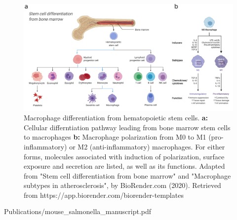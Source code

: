 \begin{figure}[htb]
    \includegraphics[width=\textwidth]{Parts/Part02/gfx/macrophage_differentiation.png}
    \caption[Macrophage differentiation.]{Macrophage differentiation from hematopoietic stem cells. \textbf{a:} Cellular differntiation pathway leading from bone marrow stem cells to macrophages \textbf{b:} Macrophage polarization from M0 to M1 (pro-inflammatory) or M2 (anti-inflammatory) macrophages. For either forms, molecules associated with induction of polarization, surface exposure and secretion are listed, as well as its functions.  Adapted from "Stem cell differentiation from bone marrow" and "Macrophage subtypes in atherosclerosis", by BioRender.com (2020). Retrieved from https://app.biorender.com/biorender-templates}
    \label{fig:02-03:macrophage}
\end{figure}



     {Publications/mouse_salmonella_manuscript.pdf}    